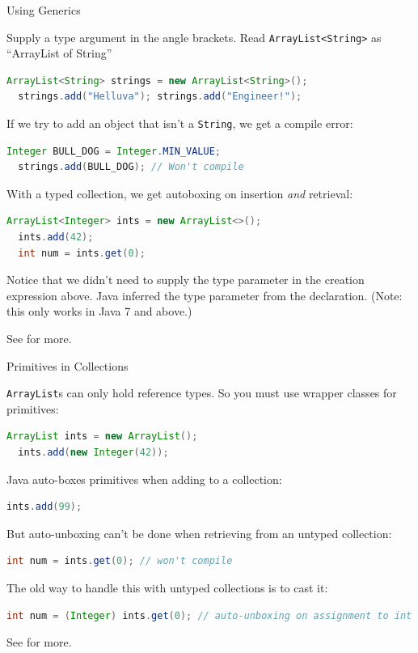 \documentclass{beamer}
\begin{document}
\begin{frame}[fragile]{Using Generics}


Supply a type argument in the angle brackets.  Read {\tt ArrayList<String>} as ``ArrayList of String''
\begin{lstlisting}[language=Java]
  ArrayList<String> strings = new ArrayList<String>();
  strings.add("Helluva"); strings.add("Engineer!");
\end{lstlisting}
If we try to add an object that isn't a {\tt String}, we get a compile error:
\begin{lstlisting}[language=Java]
  Integer BULL_DOG = Integer.MIN_VALUE;
  strings.add(BULL_DOG); // Won't compile
\end{lstlisting}

With a typed collection, we get autoboxing on insertion {\it and} retrieval:

\begin{lstlisting}[language=Java]
  ArrayList<Integer> ints = new ArrayList<>();
  ints.add(42);
  int num = ints.get(0);
\end{lstlisting}
Notice that we didn't need to supply the type parameter in the creation expression above.  Java inferred the type parameter from the declaration. (Note: this only works in Java 7 and above.)

See  for more.

\end{frame}

\begin{frame}[fragile]{Primitives in Collections}

{\tt ArrayList}s can only hold reference types.  So you must use wrapper classes for primitives:
\begin{lstlisting}[language=Java]
  ArrayList ints = new ArrayList();
  ints.add(new Integer(42));
\end{lstlisting}
Java auto-boxes primitives when adding to a collection:
\begin{lstlisting}[language=Java]
  ints.add(99);
\end{lstlisting}
But auto-unboxing can't be done when retrieving from an untyped collection:
\begin{lstlisting}[language=Java]
  int num = ints.get(0); // won't compile
\end{lstlisting}
The old way to handle this with untyped collections is to cast it:
\begin{lstlisting}[language=Java]
int num = (Integer) ints.get(0); // auto-unboxing on assignment to int
\end{lstlisting}

See  for more.
\end{frame}
\end{document}
